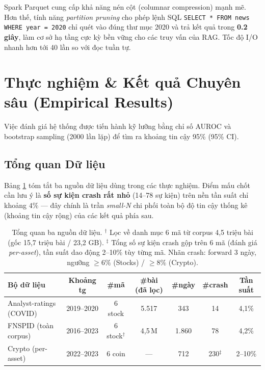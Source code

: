\documentclass[11pt, a4paper]{article}
\begin{document}
Spark Parquet cung cấp khả năng nén cột (columnar compression) mạnh mẽ. Hơn thế, tính năng \textit{partition pruning} cho phép lệnh SQL \texttt{SELECT * FROM news WHERE year = 2020} chỉ quét vào đúng thư mục 2020 và trả kết quả trong \textbf{0.2 giây}, làm cơ sở hạ tầng cực kỳ bền vững cho các truy vấn của RAG. Tốc độ I/O nhanh hơn tới 40 lần so với đọc tuần tự.

\section{Thực nghiệm \& Kết quả Chuyên sâu (Empirical Results)}

Việc đánh giá hệ thống được tiến hành kỹ lưỡng bằng chỉ số AUROC và bootstrap sampling (2000 lần lặp) để tìm ra khoảng tin cậy 95\% (95\% CI).

\subsection{Tổng quan Dữ liệu}
Bảng \ref{tab:data_overview} tóm tắt ba nguồn dữ liệu dùng trong các thực nghiệm. Điểm mấu chốt cần lưu ý là \textbf{số sự kiện crash rất nhỏ} (14--78 sự kiện) trên nền tần suất chỉ khoảng $4\%$ --- đây chính là trần \textit{small-N} chi phối toàn bộ độ tin cậy thống kê (khoảng tin cậy rộng) của các kết quả phía sau.

\begin{table}[H]
    \centering
    \renewcommand{\arraystretch}{1.2}
    \begin{tabularx}{\textwidth}{@{} l c c c c c c @{}}
    \toprule
    \textbf{Bộ dữ liệu} & \textbf{Khoảng tg} & \textbf{\#mã} & \textbf{\#bài (đã lọc)} & \textbf{\#ngày} & \textbf{\#crash} & \textbf{Tần suất} \\
    \midrule
    Analyst-ratings (COVID) & 2019--2020 & 6 stock & 5.517 & 343 & 14 & 4,1\% \\
    FNSPID (toàn corpus) & 2016--2023 & 6 stock$^\dagger$ & 4,5\,M & 1.860 & 78 & 4,2\% \\
    Crypto (per-asset) & 2022--2023 & 6 coin & --- & 712 & 230$^\ddagger$ & 2--10\% \\
    \bottomrule
    \end{tabularx}
    \caption{Tổng quan ba nguồn dữ liệu. $^\dagger$ Lọc về danh mục 6 mã từ corpus 4,5 triệu bài (gốc 15,7 triệu bài / 23,2 GB). $^\ddagger$ Tổng số sự kiện crash gộp trên 6 mã (đánh giá \textit{per-asset}), tần suất dao động 2--10\% tùy từng mã. Nhãn crash: forward 3 ngày, ngưỡng $\ge 6\%$ (Stocks) / $\ge 8\%$ (Crypto).}
    \label{tab:data_overview}
\end{table}
\end{document}
